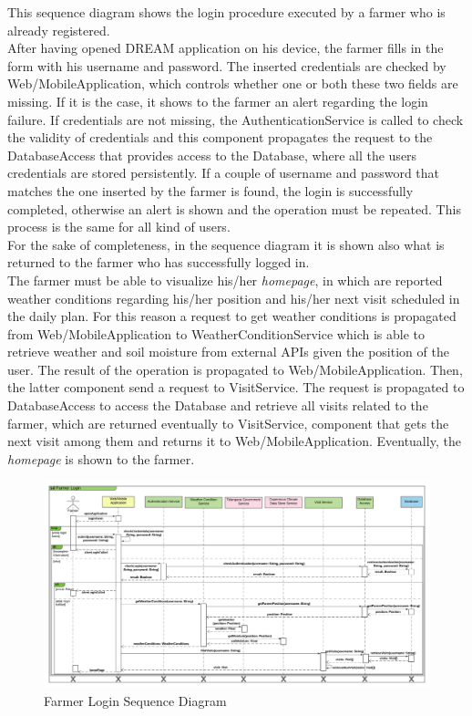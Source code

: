 This sequence diagram shows the login procedure executed by a farmer who is already registered.\\
After having opened DREAM application on his device, the farmer fills in the form with his username and password. The inserted credentials are checked by Web/MobileApplication, which controls whether one or both these two fields are missing. If it is the case, it shows to the farmer an alert regarding the login failure. If credentials are not missing, the AuthenticationService is called to check the validity of credentials and this component propagates the request to the DatabaseAccess that provides access to the Database, where all the users credentials are stored persistently. If a couple of username and password that matches the one inserted by the farmer is found, the login is successfully completed, otherwise an alert is shown and the operation must be repeated. This process is the same for all kind of users. \\
For the sake of completeness, in the sequence diagram it is shown also what is returned to the farmer who has successfully logged in. \\ 
The farmer must be able to visualize his/her \textit{homepage}, in which are reported weather conditions regarding his/her position and his/her next visit scheduled in the daily plan. For this reason a request to get weather conditions is propagated from Web/MobileApplication to WeatherConditionService which is able to retrieve weather and soil moisture from external APIs given the position of the user. The result of the operation is propagated to Web/MobileApplication. Then, the latter component send a request to VisitService. The request is propagated to DatabaseAccess to access the Database and retrieve all visits related to the farmer, which are returned eventually to VisitService, component that gets the next visit among them and returns it to Web/MobileApplication. Eventually, the \textit{homepage} is shown to the farmer. 

\newpage
\begin{landscape}
\begin{figure}[h]
\vspace*{-2cm}
\noindent
\centering
\centerline{\includegraphics[scale= 0.108]{./Images/Sequence diagram/Farmer Login Sequence Diagram.png}}
    \caption{Farmer Login Sequence Diagram}
    \vspace*{-12cm}
\end{figure}
\fillandplacepagenumber
\end{landscape}

